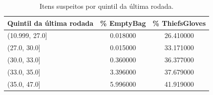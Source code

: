 \begin{table}[htbp]
\caption{Itens suspeitos por quintil da última rodada.}
\label{tab:audrod}
\centering
\small
\begin{tabular}{lcc}
\toprule
Quintil da última rodada & \% EmptyBag & \% ThiefsGloves \\
\midrule
(10.999, 27.0] & 0.018000 & 26.410000 \\
(27.0, 30.0] & 0.015000 & 33.171000 \\
(30.0, 33.0] & 0.360000 & 36.377000 \\
(33.0, 35.0] & 3.396000 & 37.679000 \\
(35.0, 47.0] & 5.996000 & 41.919000 \\
\bottomrule
\end{tabular}
\end{table}
